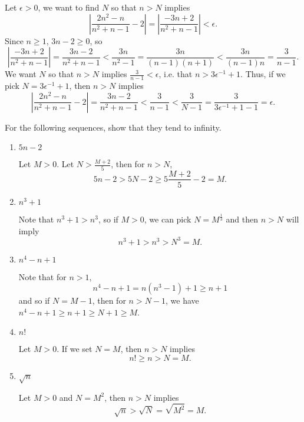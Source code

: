 \documentclass[11pt,dvipsnames]{book}
\numberwithin{equation}{section} %
\numberwithin{figure}{section} %
\numberwithin{table}{section} %
\begin{document}
\begin{exercise}
\begin{enumerate}[label=(\alph*)]
\begin{solution}
Let $\epsilon>0$, we want to find $N$ so that $n> N$ implies
\[
\left|\frac{2n^{2}-n}{n^{2}+n-1}-2\right|
=\left|\frac{-3n+2}{n^2+n-1}\right|<\epsilon.
\] 
Since $n\geq 1$, $3n-2\geq 0$, so 
\[
\left|\frac{-3n+2}{n^2+n-1}\right|=\frac{3n-2}{n^2+n-1}
<\frac{3n}{n^2-1}=\frac{3n}{(n-1)(n+1)}<\frac{3n}{(n-1)n}=\frac{3}{n-1}.
\]
We want $N$ so that $n> N$ implies $\frac{3}{n-1}<\epsilon$, i.e. that $n>3\epsilon^{-1}+1$. Thus, if we pick $N=3\epsilon^{-1}+1$, then $n> N$ implies 
\[
\left|\frac{2n^{2}-n}{n^{2}+n-1}-2\right|=\frac{3n-2}{n^2+n-1}<\frac{3}{n-1}< \frac{3}{N-1} =\frac{3}{3\epsilon^{-1}+1-1}=\epsilon.
\]

\end{solution}

\end{enumerate}
 
 \end{exercise}
 
 
 \begin{exercise}
 For the following sequences, show that they tend to infinity. 
 
\begin{enumerate}[label=(\alph*)]
\item $5n-2$
\begin{solution}
Let $M>0$. Let $N>\frac{M+2}{5}$, then for $n> N$, 
\[
5n-2> 5N-2\geq 5\frac{M+2}{5}-2=M.
\]
\end{solution}
\item $n^{3}+1$
\begin{solution}
Note that $n^3+1>n^3$, so if $M>0$, we can pick $N=M^{\frac{1}{3}}$ and then $n> N$ will imply
\[
n^3+1>n^3> N^3=M.
\]
\end{solution}
\item $n^{4}-n+1$
\begin{solution}
Note that for $n>1$,
\[
n^4-n+1=n(n^3-1)+1\geq n+1
\]
and so if $N=M-1$, then for $n>N-1$, we have $n^4-n+1\geq n+1\geq N+1\geq M$.
\end{solution}
\item $n!$
\begin{solution}
Let $M>0$. If we set $N=M$, then $n> N$ implies
\[
n!\geq n> N=M.
\]
\end{solution}
\item $\sqrt{n}$
\begin{solution}
Let $M>0$ and $N=M^2$, then $n> N$ implies
\[
\sqrt{n}> \sqrt{N}=\sqrt{M^2}=M.
\]
\end{solution}
\end{enumerate}
\end{exercise}
 
\end{document}
